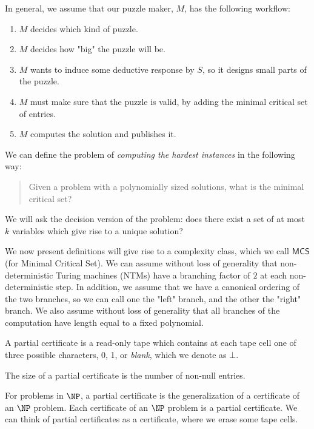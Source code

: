 \documentclass[runningheads,a4paper]{llncs}
\begin{document}
In general, we assume that our puzzle maker, $M$, has the following workflow:
\begin{enumerate}
\item $M$ decides which kind of puzzle.
\item $M$ decides how "big" the puzzle will be.
\item $M$ wants to induce some deductive response by $S$, so it designs small parts of the puzzle.
\item $M$ must make sure that the puzzle is valid, by adding the minimal critical set of entries.
\item $M$ computes the solution and publishes it. 
\end{enumerate}

We can define the problem of \emph{computing the hardest instances} in the following way: 

\begin{quote}
Given a problem with a polynomially sized solutions, what is the minimal critical set?
\end{quote}

We will ask the decision version of the problem: does there exist a set of at most $k$ variables which give rise to a unique solution?

We now present definitions will give rise to a complexity class, which we call  $\mathsf{MCS}$ (for Minimal Critical Set). We can assume without loss of generality that non-deterministic Turing machines (NTMs) have a branching factor of $2$ at each non-deterministic step. In addition, we assume that we have a canonical ordering of the two branches, so we can call one the "left" branch, and the other the "right" branch. We also assume without loss of generality that all branches of the computation have length equal to a fixed polynomial.

\begin{definition}
A partial certificate is a read-only tape which contains at each tape cell one of three possible characters, 0, 1, or \emph{blank}, which we denote as $\bot$.
\end{definition}

\begin{definition}
The size of a partial certificate is the number of non-null entries. 
\end{definition}

For problems in $\NP$, a partial certificate is the generalization of a certificate of an $\NP$ problem. Each certificate of an $\NP$ problem is a partial certificate. We can think of partial certificates as a certificate, where we erase some tape cells.
\end{document}

